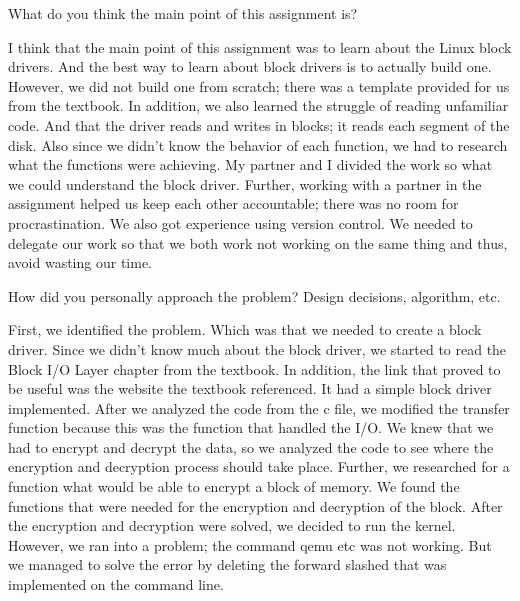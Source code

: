 \documentclass{article}
\newenvironment{question}[2][Question]{\begin{trivlist}
\item[\hskip \labelsep {\bfseries #1}\hskip \labelsep {\bfseries #2.}]}{\end{trivlist}}
\begin{document}
\begin{question}{1}
What do you think the main point of this assignment is?
\end{question}
I think that the main point of this assignment was to learn about the Linux
block drivers. And the best way to learn about block drivers is to actually
build one. However, we did not build one from scratch; there was a template
provided for us from the textbook. In addition, we also learned the struggle of
reading unfamiliar code. And that the driver reads and writes in blocks; it
reads each segment of the disk. Also since we didn't know the behavior of each
function, we had to research what the functions were achieving. My partner and
I divided the work so what we could understand the block driver. Further,
working with a partner in the assignment helped us keep each other accountable;
there was no room for procrastination. We also got experience using version
control. We needed to delegate our work so that we both work not working on the
same thing and thus, avoid wasting our time.





\vspace{0.25in} %

\begin{question}{2}
How did you personally approach the problem? Design decisions, algorithm, etc.
\end{question}
First, we identified the problem. Which was that we needed to create a block
driver. Since we didn’t know much about the block driver, we started to read
the Block I/O Layer chapter from the textbook. In addition, the link that
proved to be useful was the website the textbook referenced. It had a simple
block driver implemented. After we analyzed the code from the c file, we
modified the transfer function because this was the function that handled the
I/O. We knew that we had to encrypt and decrypt the data, so we analyzed the
code to see where the encryption and decryption process should take place.
Further, we researched for a function what would be able to encrypt a block of
memory. We found the functions that were needed for the encryption and
decryption of the block. After the encryption and decryption were solved, we
decided to run the kernel. However, we ran into a problem; the command qemu etc
was not working. But we managed to solve the error by deleting the forward
slashed that was implemented on the command line.
\end{document}
